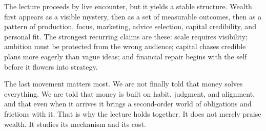 The lecture proceeds by live encounter, but it yields a stable structure. Wealth first appears as a visible mystery, then as a set of measurable outcomes, then as a pattern of production, focus, marketing, advice selection, capital credibility, and personal fit. The strongest recurring claims are these: scale requires visibility; ambition must be protected from the wrong audience; capital chases credible plans more eagerly than vague ideas; and financial repair begins with the self before it flowers into strategy.

The last movement matters most. We are not finally told that money solves everything. We are told that money is built on habit, judgment, and alignment, and that even when it arrives it brings a second-order world of obligations and frictions with it. That is why the lecture holds together. It does not merely praise wealth. It studies its mechanism and its cost.